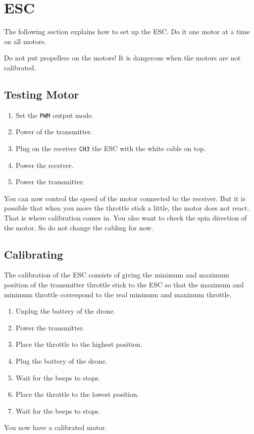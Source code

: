 \section{ESC}
The following section explains how to set up the ESC.
Do it one motor at a time on all motors.

Do not put propellers on the motors! It is dangerous when the motors are not calibrated.
\subsection{Testing Motor}

\begin{enumerate}
    \item Set the \texttt{PWM} output mode.
    \item Power of the transmitter.
    \item Plug on the receiver \texttt{CH3} the ESC with the white cable on top.
    \item Power the receiver.
    \item Power the transmitter.
\end{enumerate}
You can now control the speed of the motor connected to the receiver. But it is possible that when you move the throttle stick a little, the motor does not react. That is where calibration comes in. You also want to check the spin direction of the motor. So do not change the cabling for now.

\subsection{Calibrating}
The calibration of the ESC consists of giving the minimum and maximum position of the transmitter throttle stick to the ESC so that the maximum and minimum throttle correspond to the real minimum and maximum throttle.

\begin{enumerate}
    \item Unplug the battery of the drone.
    \item Power the transmitter.
    \item Place the throttle to the highest position.
    \item Plug the battery of the drone.
    \item Wait for the beeps to stops.
    \item Place the throttle to the lowest position.
    \item Wait for the beeps to stops.
\end{enumerate}
You now have a calibrated motor.


